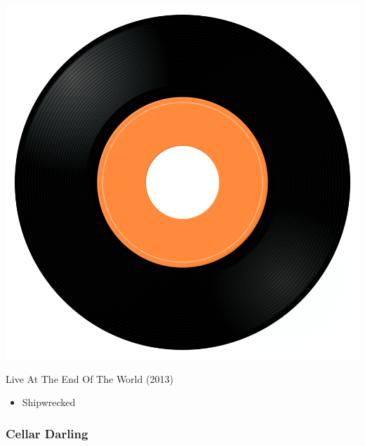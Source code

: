 \begin{minipage}[t]{0.25\textwidth}
\captionsetup{type=figure}
\includegraphics[width=\textwidth]{Images/cover.png}
\caption*{Live At The End Of The World (2013)}
\end{minipage}
\begin{minipage}[t]{0.25\textwidth}\vspace{0pt}
\begin{itemize}[nosep,leftmargin=1em,labelwidth=*,align=left]
	\setlength{\itemsep}{0pt}
	\item Shipwrecked
\end{itemize}
\end{minipage}

\subsubsection{Cellar Darling}

